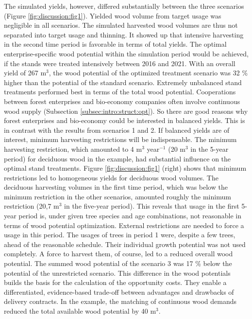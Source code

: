 The simulated yields, however, differed substantially between the three scenarios (Figure \ref{fig:discussion:fig1}). Yielded wood volume from target usage was negligible in all scenarios. The simulated harvested wood volumes are thus not separated into target usage and thinning. It showed up that intensive harvesting in the second time period is favorable in terms of total yields. The optimal enterprise-specific wood potential within the simulation period would be achieved, if the stands were treated intensively between 2016 and 2021. With an overall yield of 267 m$^3$, the wood potential of the optimized treatment scenario was 32 \% higher than the potential of the standard scenario. Extremely unbalanced stand treatments performed best in terms of the total wood potential. Cooperations between forest enterprises and bio-economy companies often involve continuous wood supply (Subsection \ref{subsec:intro:struct:opt}). So there are good reasons why forest enterprises and bio-economy could be interested in balanced yields. This is in contrast with the results from scenarios 1 and 2. If balanced yields are of interest, minimum harvesting restrictions will be indispensable. The minimum harvesting restriction, which amounted to 4 m$^3$ year$^{-1}$ (20 m$^3$ in the 5-year period) for deciduous wood in the example, had substantial influence on the optimal stand treatments. Figure \ref{fig:discussion:fig1} (right) shows that minimum restrictions led to homogeneous yields for deciduous wood volumes. The deciduous harvesting volumes in the first time period, which was below the minimum restriction in the other scenarios, amounted roughly the minimum restriction (20,7 m$^3$ in the five-year period). This reveals that usage in the first 5-year period is, under given tree species and age combinations, not reasonable in terms of wood potential optimization. External restrictions are needed to force a usage in this period. The usages of trees in period 1 were, despite a few trees, ahead of the reasonable schedule. Their individual growth potential was not used completely. A force to harvest them, of course, led to a reduced overall wood potential. The summed wood potential of the scenario 3 was 17 \% below the potential of the unrestricted scenario. This difference in the wood potentials builds the basis for the calculation of the opportunity costs. They enable a differentiated, evidence-based trade-off between advantages and drawbacks of delivery contracts. In the example, the matching of continuous wood demands reduced the total available wood potential by 40 m$^3$.


